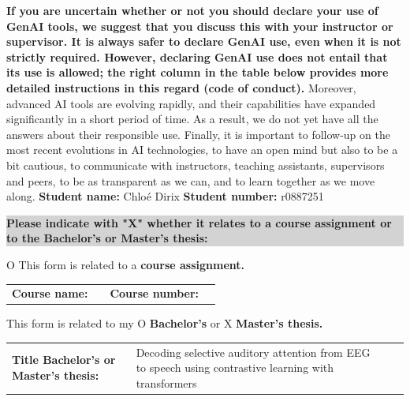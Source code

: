 \textbf{If you are uncertain whether or not you should declare your use of GenAI tools, we suggest that you discuss this with your instructor or supervisor. It is always safer to declare GenAI use, even when it is not strictly required. However, declaring GenAI use does not entail that its use is allowed; the right column in the table below provides more detailed instructions in this regard (code of conduct). }
\newline
\newline
Moreover, advanced AI tools are evolving rapidly, and their capabilities have expanded significantly in a short period of time. As a result, we do not yet have all the answers about their responsible use. Finally, it is important to follow-up on the most recent evolutions in AI technologies, to have an open mind but also to be a bit cautious, to communicate with instructors, teaching assistants, supervisors and peers, to be as transparent as we can, and to learn together as we move along.
\newpage
\noindent
\textbf{Student name:} Chloé Dirix \hfill \textbf{Student number:} r0887251

\vspace{1em}

\noindent
\colorbox{lightgray}{\parbox{\dimexpr\linewidth-2\fboxsep\relax}{\textbf{Please indicate with "X" whether it relates to a course assignment or to the Bachelor’s or Master’s thesis:}}}

\vspace{1em}

O This form is related to a \textbf{course assignment.}

\begin{tabularx}{\linewidth}{@{}lXlX@{}}
\textbf{Course name:} & \dotfill & \textbf{Course number:} & \dotfill \\
\end{tabularx}

\vspace{1em}

This form is related to my O \textbf{Bachelor’s} or X \textbf{Master’s thesis.}

\begin{tabularx}{\linewidth}{@{}XXll@{}}
\textbf{Title Bachelor’s or Master’s thesis:} & Decoding selective auditory attention from EEG to speech using contrastive learning with transformers \\
\end{tabularx}

